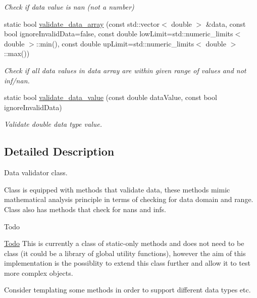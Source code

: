 \begin{DoxyCompactItemize}
\begin{DoxyCompactList}\small\item\em Check if data value is nan (not a number) \end{DoxyCompactList}\item 
\hypertarget{classIneosTest_1_1DataValidator_a21f41ffc3137c3a84c2890d76cff0cac}{static bool \hyperlink{classIneosTest_1_1DataValidator_a21f41ffc3137c3a84c2890d76cff0cac}{validate\-\_\-data\-\_\-array} (const std\-::vector$<$ double $>$ \&data, const bool ignore\-Invalid\-Data=false, const double low\-Limit=std\-::numeric\-\_\-limits$<$ double $>$\-::min(), const double up\-Limit=std\-::numeric\-\_\-limits$<$ double $>$\-::max())}\label{classIneosTest_1_1DataValidator_a21f41ffc3137c3a84c2890d76cff0cac}

\begin{DoxyCompactList}\small\item\em Check if all data values in data array are within given range of values and not inf/nan. \end{DoxyCompactList}\item 
static bool \hyperlink{classIneosTest_1_1DataValidator_a6da5b98791cbdb78057479dc97edcf3b}{validate\-\_\-data\-\_\-value} (const double data\-Value, const bool ignore\-Invalid\-Data)
\begin{DoxyCompactList}\small\item\em Validate double data type value. \end{DoxyCompactList}\end{DoxyCompactItemize}


\subsection{Detailed Description}
Data validator class. 

Class is equipped with methods that validate data, these methods mimic mathematical analysis principle in terms of checking for data domain and range. Class also has methods that check for nans and infs. \begin{DoxyRefDesc}{Todo}
\item[\hyperlink{todo__todo000003}{Todo}]This is currently a class of static-\/only methods and does not need to be class (it could be a library of global utility functions), however the aim of this implementation is the possiblity to extend this class further and allow it to test more complex objects. 

Consider templating some methods in order to support different data types etc. \end{DoxyRefDesc}


